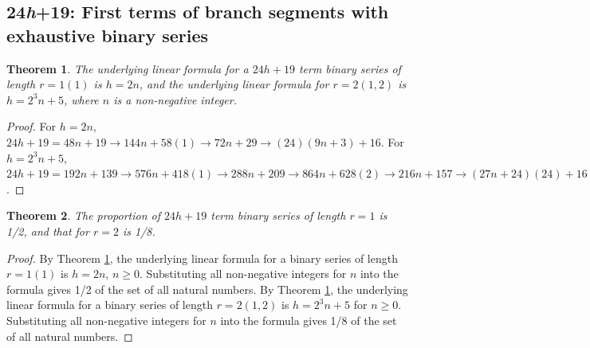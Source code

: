 \documentclass[sn-mathphys-num, pdflatex]{sn-jnl}
\newtheorem{theorem}{Theorem}[section]
\begin{document}
\subsection{24\textit{h}+19: First terms of branch segments with exhaustive binary series}\label{sec6.4}
\begin{theorem}\label{th:24h19_base}
     The underlying linear formula for a $24h+19$ term binary series of length $r=1 (1)$ is $h=2n$, and the underlying linear formula for $r =2 (1, 2)$ is $h=2^3n+5$, where $n$ is a non-negative integer.
\end{theorem}
\begin{proof}
    For $h=2n$, $24h+19 = 48n+19\to 144n+58(1)\to 72n+29\to (24)(9n+3)+16$.    
    For $h=2^3n+5$, $24h+19 = 192n+139\to 576n+418(1)\to 288n+209\to 864n+628(2)\to 216n+157\to (27n+24)(24)+16$.
\end{proof}

\begin{theorem}\label{th:24h19_prop}
    The proportion of $24h+19$ term binary series of length $r=1$ is 1/2, and that for $r=2$ is 1/8.
\end{theorem}
\begin{proof}
    By Theorem \ref{th:24h19_base}, the underlying linear formula for a binary series of length $r=1 (1)$ is $h=2n$, $n \ge 0$. Substituting all non-negative integers for $n$ into the formula gives 1/2 of the set of all natural numbers.
    By Theorem \ref{th:24h19_base}, the underlying linear formula for a binary series of length $r=2 (1, 2)$ is $h=2^3n+5$ for $n \ge 0$. Substituting all non-negative integers for $n$ into the formula gives 1/8 of the set of all natural numbers.
\end{proof}
\end{document}
